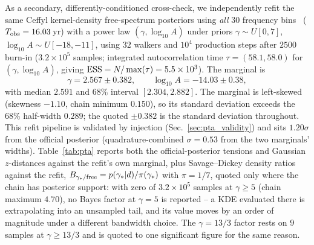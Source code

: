 \documentclass[aps,prd,twocolumn,superscriptaddress,nofootinbib,longbibliography]{revtex4-2}
\begin{document}
As a secondary, differently-conditioned cross-check, we independently refit
the same Ceffyl kernel-density free-spectrum posteriors using \emph{all}
$30$ frequency bins~\cite{NANOGrav15,NANOGravKDE} ($T_{\rm obs}=16.03\,$yr)
with a power law $(\gamma,\log_{10}A)$ under priors $\gamma\sim U[0,7]$,
$\log_{10}A\sim U[-18,-11]$, using $32$ walkers and $10^4$ production steps
after $2500$ burn-in ($3.2\times10^5$ samples; integrated autocorrelation
time $\tau=(58.1,58.0)$ for $(\gamma,\log_{10}A)$, giving
${\rm ESS}=N/\max(\tau)=5.5\times10^3$). The
marginal is
\begin{equation}
  \gamma = 2.567 \pm 0.382, \qquad
  \log_{10} A = -14.03 \pm 0.38 ,
  \label{eq:gamma}
\end{equation}
with median $2.591$ and $68\%$ interval $[2.304,2.882]$. The marginal is
left-skewed (skewness $-1.10$, chain minimum $0.150$), so its standard
deviation exceeds the $68\%$ half-width $0.289$; the quoted $\pm0.382$ is
the standard deviation throughout. This refit pipeline is
validated by injection (Sec.~\ref{sec:pta_validity}) and sits $1.20\sigma$ from
the official posterior (quadrature-combined $\sigma=0.53$ from the two marginals' widths). Table~\ref{tab:pta} reports both the official-posterior
tensions and Gaussian $z$-distances against the refit's own marginal, plus
Savage--Dickey density ratios against the refit,
$B_{\gamma_*/{\rm free}}=p(\gamma_*|d)/\pi(\gamma_*)$ with $\pi=1/7$, quoted
only where the chain has posterior support: with zero of $3.2\times10^5$
samples at $\gamma\ge5$ (chain maximum $4.70$), no Bayes factor at $\gamma=5$
is reported -- a KDE evaluated there is extrapolating into an unsampled tail,
and its value moves by an order of magnitude under a different bandwidth
choice. The $\gamma=13/3$ factor rests on $9$ samples at $\gamma\ge13/3$ and is
quoted to one significant figure for the same reason.
\end{document}
